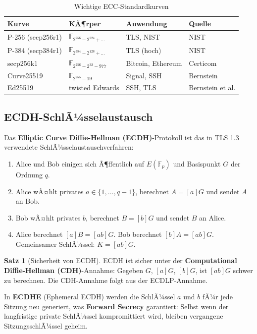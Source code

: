 ﻿\documentclass[a4paper,12pt]{scrreprt}
\theoremstyle{definition}
\newtheorem{satz}{Satz}[section]
\begin{document}
\begin{table}[ht]
\centering
\caption{Wichtige ECC-Standardkurven}
\begin{tabular}{@{}llll@{}}
\toprule
\textbf{Kurve} & \textbf{KÃ¶rper} & \textbf{Anwendung} & \textbf{Quelle} \\
\midrule
P-256 (secp256r1) & $\mathbb{F}_{2^{256}-2^{224}+\ldots}$ & TLS, NIST & NIST \\
P-384 (secp384r1) & $\mathbb{F}_{2^{384}-2^{128}+\ldots}$ & TLS (hoch) & NIST \\
secp256k1 & $\mathbb{F}_{2^{256}-2^{32}-977}$ & Bitcoin, Ethereum & Certicom \\
Curve25519 & $\mathbb{F}_{2^{255}-19}$ & Signal, SSH & Bernstein \\
Ed25519 & twisted Edwards & SSH, TLS & Bernstein et al. \\
\bottomrule
\end{tabular}
\end{table}

\subsection{ECDH-SchlÃ¼sselaustausch}

Das \textbf{Elliptic Curve Diffie-Hellman (ECDH)}-Protokoll \cite{Kob87,Mil86} ist das in TLS 1.3 \cite{Res18} verwendete SchlÃ¼sselaustauschverfahren:

\begin{enumerate}
    \item Alice und Bob einigen sich Ã¶ffentlich auf $E(\mathbb{F}_p)$ und Basispunkt $G$ der Ordnung $q$.
    \item Alice wÃ¤hlt privates $a \in \{1,\ldots,q-1\}$, berechnet $A = [a]G$ und sendet $A$ an Bob.
    \item Bob wÃ¤hlt privates $b$, berechnet $B = [b]G$ und sendet $B$ an Alice.
    \item Alice berechnet $[a]B = [ab]G$. Bob berechnet $[b]A = [ab]G$. Gemeinsamer SchlÃ¼ssel: $K = [ab]G$.
\end{enumerate}

\begin{satz}[Sicherheit von ECDH]
ECDH ist sicher unter der \textbf{Computational Diffie-Hellman (CDH)}-Annahme: Gegeben $G$, $[a]G$, $[b]G$, ist $[ab]G$ schwer zu berechnen. Die CDH-Annahme folgt aus der ECDLP-Annahme.
\end{satz}

In \textbf{ECDHE} (Ephemeral ECDH) werden die SchlÃ¼ssel $a$ und $b$ fÃ¼r jede Sitzung neu generiert, was \textbf{Forward Secrecy} garantiert: Selbst wenn der langfristige private SchlÃ¼ssel kompromittiert wird, bleiben vergangene SitzungsschlÃ¼ssel geheim.
\end{document}
